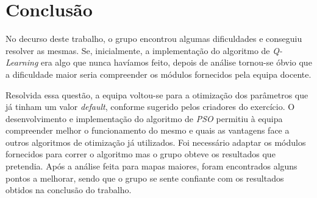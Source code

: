 \documentclass[runningheads]{article}
\begin{document}
\newpage
\section{Conclusão}
\label{Conc}
No decurso deste trabalho, o grupo encontrou algumas dificuldades e conseguiu resolver as mesmas. Se, inicialmente, a implementação do algoritmo de \textit{Q-Learning} era algo que nunca havíamos feito, depois de análise tornou-se óbvio que a dificuldade maior seria compreender os módulos fornecidos pela equipa docente.
\par Resolvida essa questão, a equipa voltou-se para a otimização dos parâmetros que já tinham um valor \textit{default}, conforme sugerido pelos criadores do exercício. O desenvolvimento e implementação do algoritmo de \textit{PSO} permitiu à equipa compreender melhor o funcionamento do mesmo e quais as vantagens face a outros algoritmos de otimização já utilizados. Foi necessário adaptar os módulos fornecidos para correr o algoritmo mas o grupo obteve os resultados que pretendia. Após a análise feita para mapas maiores, foram encontrados alguns pontos a melhorar, sendo que o grupo se sente confiante com os resultados obtidos na conclusão do trabalho.
\end{document}
